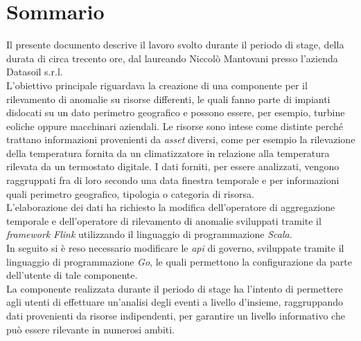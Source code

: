 
\cleardoublepage
{}
{}
\begingroup
\let\clearpage\relax
\let\cleardoublepage\relax
\let\cleardoublepage\relax

\chapter*{Sommario}

Il presente documento descrive il lavoro svolto durante il periodo di stage, della durata di circa trecento ore, dal laureando Niccolò Mantovani presso l'azienda Datasoil s.r.l.\\
L'obiettivo principale riguardava la creazione di una componente per il rilevamento di anomalie su risorse differenti, le quali fanno parte di impianti dislocati su un dato perimetro geografico e possono essere, per esempio, turbine eoliche oppure macchinari aziendali. Le risorse sono intese come distinte perché trattano informazioni provenienti da \textit{asset} diversi, come per esempio la rilevazione della temperatura fornita da un climatizzatore in relazione alla temperatura rilevata da un termostato digitale. I dati forniti, per essere analizzati, vengono raggruppati fra di loro secondo una data finestra temporale e per informazioni quali perimetro geografico, tipologia o categoria di risorsa.\\
L'elaborazione dei dati ha richiesto la modifica dell'operatore di aggregazione temporale e dell'operatore di rilevamento di anomalie sviluppati tramite il \textit{\textit{\gls{framework}}} \textit{Flink} utilizzando il linguaggio di programmazione \textit{Scala}.\\
In seguito si è reso necessario modificare le \textit{\gls{api}} di governo, sviluppate tramite il linguaggio di programmazione \textit{Go}, le quali permettono la configurazione da parte dell'utente di tale componente.\\
La componente realizzata durante il periodo di stage ha l'intento di permettere agli utenti di effettuare un'analisi degli eventi a livello d'insieme, raggruppando dati provenienti da risorse indipendenti, per garantire un livello informativo che può essere rilevante in numerosi ambiti.

%
%

\endgroup			

\vfill


